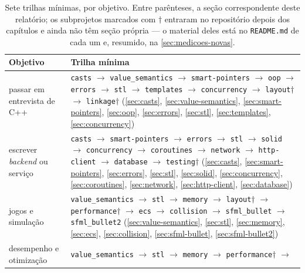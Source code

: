 \begin{table}[htbp]
\centering
\caption{Sete trilhas mínimas, por objetivo. Entre parênteses, a seção
         correspondente deste relatório; os subprojetos marcados com $\dagger$
         entraram no repositório depois dos capítulos e ainda não têm seção
         própria --- o material deles está no \texttt{README.md} de cada um e,
         resumido, na \cref{sec:medicoes-novas}.}
\label{tab:atalhos}
\footnotesize
\begin{tabular}{@{}lp{}@{}}
\toprule
\textbf{Objetivo} & \textbf{Trilha mínima} \\
\midrule
passar em entrevista de C++ &
    \texttt{casts} $\rightarrow$ \texttt{value\_semantics} $\rightarrow$
    \texttt{smart-pointers} $\rightarrow$ \texttt{oop} $\rightarrow$
    \texttt{errors} $\rightarrow$ \texttt{stl} $\rightarrow$
    \texttt{templates} $\rightarrow$ \texttt{concurrency} $\rightarrow$
    \texttt{layout}$\dagger$ $\rightarrow$ \texttt{linkage}$\dagger$
    (\ref{sec:casts}, \ref{sec:value-semantics}, \ref{sec:smart-pointers},
     \ref{sec:oop}, \ref{sec:errors}, \ref{sec:stl}, \ref{sec:templates},
     \ref{sec:concurrency}) \\[4pt]
escrever \emph{backend} ou serviço &
    \texttt{casts} $\rightarrow$ \texttt{smart-pointers} $\rightarrow$
    \texttt{errors} $\rightarrow$ \texttt{stl} $\rightarrow$ \texttt{solid}
    $\rightarrow$ \texttt{concurrency} $\rightarrow$ \texttt{coroutines}
    $\rightarrow$ \texttt{network} $\rightarrow$ \texttt{http-client}
    $\rightarrow$ \texttt{database} $\rightarrow$ \texttt{testing}$\dagger$
    (\ref{sec:casts}, \ref{sec:smart-pointers}, \ref{sec:errors},
     \ref{sec:stl}, \ref{sec:solid}, \ref{sec:concurrency},
     \ref{sec:coroutines}, \ref{sec:network}, \ref{sec:http-client},
     \ref{sec:database}) \\[4pt]
jogos e simulação &
    \texttt{value\_semantics} $\rightarrow$ \texttt{stl} $\rightarrow$
    \texttt{memory} $\rightarrow$ \texttt{layout}$\dagger$ $\rightarrow$
    \texttt{performance}$\dagger$ $\rightarrow$ \texttt{ecs} $\rightarrow$
    \texttt{collision} $\rightarrow$ \texttt{sfml\_bullet} $\rightarrow$
    \texttt{sfml\_bullet2}
    (\ref{sec:value-semantics}, \ref{sec:stl}, \ref{sec:memory},
     \ref{sec:ecs}, \ref{sec:collision}, \ref{sec:sfml-bullet},
     \ref{sec:sfml-bullet2}) \\[4pt]
desempenho e otimização &
    \texttt{value\_semantics} $\rightarrow$ \texttt{stl} $\rightarrow$
    \texttt{memory} $\rightarrow$ \texttt{performance}$\dagger$ $\rightarrow$

\end{tabular}
\end{table}
